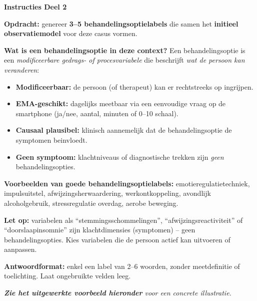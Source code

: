 \documentclass[11pt,a4paper]{article}
\begin{document}
\begin{tcolorbox}[colback=green!3,colframe=ForestGreen,arc=2.5mm,boxrule=0.9pt,
  left=10pt,right=10pt,top=9pt,bottom=9pt]
\textbf{\color{ForestGreen}Instructies Deel 2}

\smallskip\small
\textbf{Opdracht:} genereer \textbf{3--5 behandelingsoptielabels} die samen het
\textbf{initieel observatiemodel} voor deze casus vormen.

\textbf{Wat is een behandelingsoptie in deze context?}
Een behandelingsoptie is een \emph{modificeerbare gedrags- of procesvariabele} die beschrijft
\emph{wat de persoon kan veranderen}:
\begin{itemize}[topsep=2pt,itemsep=1pt]
\item \textbf{Modificeerbaar:} de persoon (of therapeut) kan er rechtstreeks op ingrijpen.
\item \textbf{EMA-geschikt:} dagelijks meetbaar via een eenvoudige vraag op de smartphone
(ja/nee, aantal, minuten of 0--10 schaal).
\item \textbf{Causaal plausibel:} klinisch aannemelijk dat de behandelingsoptie de symptomen beinvloedt.
\item \textbf{Geen symptoom:} klachtniveaus of diagnostische trekken zijn
\emph{geen} behandelingsopties.
\end{itemize}

\textbf{Voorbeelden van goede behandelingsoptielabels:}
emotieregulatietechniek, impulsuitstel, afwijzingsherwaardering, werkontkoppeling,
avondlijk alcoholgebruik, stressregulatie overdag, aerobe beweging.

\textbf{Let op:} variabelen als ``stemmingsschommelingen'', ``afwijzingsreactiviteit'' of
``doorslaapinsomnie'' zijn klachtdimensies (symptomen) -- geen behandelingsopties. Kies
variabelen die de persoon actief kan uitvoeren of aanpassen.

\textbf{Antwoordformat:} enkel een label van 2--6 woorden, zonder meetdefinitie of toelichting.
Laat ongebruikte velden leeg.

\medskip
\textit{\textbf{Zie het uitgewerkte voorbeeld hieronder} voor een concrete illustratie.}
\end{tcolorbox}

\vspace{0.5em}
\nopagebreak[4]
\end{document}

